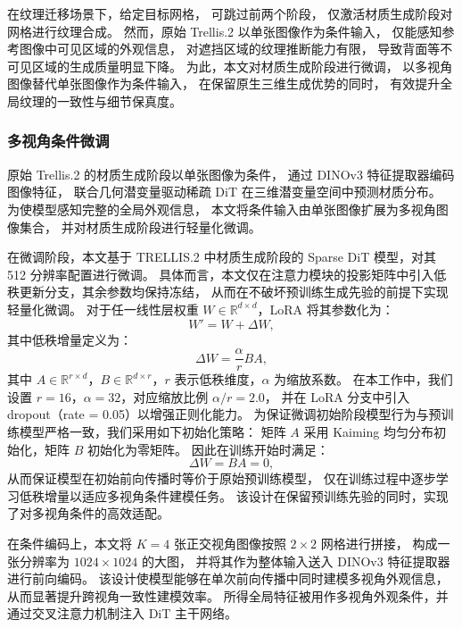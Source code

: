 在纹理迁移场景下，给定目标网格，
可跳过前两个阶段，
仅激活材质生成阶段对网格进行纹理合成。
然而，原始 Trellis.2 以单张图像作为条件输入，
仅能感知参考图像中可见区域的外观信息，
对遮挡区域的纹理推断能力有限，
导致背面等不可见区域的生成质量明显下降。
为此，本文对材质生成阶段进行微调，
以多视角图像替代单张图像作为条件输入，
在保留原生三维生成优势的同时，
有效提升全局纹理的一致性与细节保真度。

\subsubsection{多视角条件微调}
原始 Trellis.2 的材质生成阶段以单张图像为条件，
通过 DINOv3 特征提取器\cite{simeoni2025dinov3}编码图像特征，
联合几何潜变量驱动稀疏 DiT 在三维潜变量空间中预测材质分布。
为使模型感知完整的全局外观信息，
本文将条件输入由单张图像扩展为多视角图像集合，
并对材质生成阶段进行轻量化微调。

在微调阶段，本文基于 TRELLIS.2 中材质生成阶段的 Sparse DiT 模型，对其 512 分辨率配置进行微调。
具体而言，本文仅在注意力模块的投影矩阵中引入低秩更新分支，其余参数均保持冻结，
从而在不破坏预训练生成先验的前提下实现轻量化微调。
对于任一线性层权重 $W \in \mathbb{R}^{d \times d}$，LoRA 将其参数化为：
\begin{equation}
W' = W + \Delta W,
\end{equation}
其中低秩增量定义为：
\begin{equation}
\Delta W = \frac{\alpha}{r} BA,
\end{equation}
其中 $A \in \mathbb{R}^{r \times d}$，$B \in \mathbb{R}^{d \times r}$，$r$ 表示低秩维度，$\alpha$ 为缩放系数。
在本工作中，我们设置 $r=16$，$\alpha=32$，对应缩放比例 $\alpha / r = 2.0$，
并在 LoRA 分支中引入 dropout（rate = 0.05）以增强正则化能力。
为保证微调初始阶段模型行为与预训练模型严格一致，我们采用如下初始化策略：
矩阵 $A$ 采用 Kaiming 均匀分布\cite{he2015delving}初始化，矩阵 $B$ 初始化为零矩阵。
因此在训练开始时满足：
\begin{equation}
\Delta W = BA = 0,
\end{equation}
从而保证模型在初始前向传播时等价于原始预训练模型，
仅在训练过程中逐步学习低秩增量以适应多视角条件建模任务。
该设计在保留预训练先验的同时，实现了对多视角条件的高效适配。

在条件编码上，本文将 $K=4$ 张正交视角图像按照 $2 \times 2$ 网格进行拼接，
构成一张分辨率为 $1024 \times 1024$ 的大图，
并将其作为整体输入送入 DINOv3 特征提取器\cite{simeoni2025dinov3}进行前向编码。
该设计使模型能够在单次前向传播中同时建模多视角外观信息，从而显著提升跨视角一致性建模效率。
所得全局特征被用作多视角外观条件，并通过交叉注意力机制注入 DiT 主干网络。

